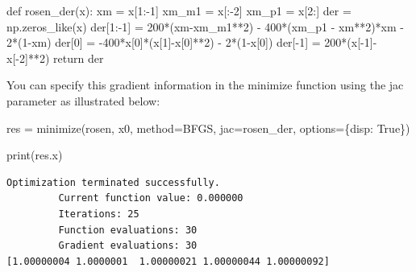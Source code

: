 \documentclass[
  letterpaper,
  DIV=11,
  numbers=noendperiod]{scrreprt}
\newenvironment{Shaded}{\begin{snugshade}}{\end{snugshade}}
\newcommand{\BuiltInTok}[1]{\textcolor[rgb]{0.00,0.23,0.31}{#1}}
\newcommand{\ControlFlowTok}[1]{\textcolor[rgb]{0.00,0.23,0.31}{#1}}
\newcommand{\DecValTok}[1]{\textcolor[rgb]{0.68,0.00,0.00}{#1}}
\newcommand{\KeywordTok}[1]{\textcolor[rgb]{0.00,0.23,0.31}{#1}}
\newcommand{\NormalTok}[1]{\textcolor[rgb]{0.00,0.23,0.31}{#1}}
\newcommand{\OperatorTok}[1]{\textcolor[rgb]{0.37,0.37,0.37}{#1}}
\newcommand{\StringTok}[1]{\textcolor[rgb]{0.13,0.47,0.30}{#1}}
\newcommand{\VariableTok}[1]{\textcolor[rgb]{0.07,0.07,0.07}{#1}}
\begin{document}
\begin{tcolorbox}
\begin{Shaded}
\begin{Highlighting}[]
\KeywordTok{def}\NormalTok{ rosen\_der(x):}
\NormalTok{    xm }\OperatorTok{=}\NormalTok{ x[}\DecValTok{1}\NormalTok{:}\OperatorTok{{-}}\DecValTok{1}\NormalTok{]}
\NormalTok{    xm\_m1 }\OperatorTok{=}\NormalTok{ x[:}\OperatorTok{{-}}\DecValTok{2}\NormalTok{]}
\NormalTok{    xm\_p1 }\OperatorTok{=}\NormalTok{ x[}\DecValTok{2}\NormalTok{:]}
\NormalTok{    der }\OperatorTok{=}\NormalTok{ np.zeros\_like(x)}
\NormalTok{    der[}\DecValTok{1}\NormalTok{:}\OperatorTok{{-}}\DecValTok{1}\NormalTok{] }\OperatorTok{=} \DecValTok{200}\OperatorTok{*}\NormalTok{(xm}\OperatorTok{{-}}\NormalTok{xm\_m1}\OperatorTok{**}\DecValTok{2}\NormalTok{) }\OperatorTok{{-}} \DecValTok{400}\OperatorTok{*}\NormalTok{(xm\_p1 }\OperatorTok{{-}}\NormalTok{ xm}\OperatorTok{**}\DecValTok{2}\NormalTok{)}\OperatorTok{*}\NormalTok{xm }\OperatorTok{{-}} \DecValTok{2}\OperatorTok{*}\NormalTok{(}\DecValTok{1}\OperatorTok{{-}}\NormalTok{xm)}
\NormalTok{    der[}\DecValTok{0}\NormalTok{] }\OperatorTok{=} \OperatorTok{{-}}\DecValTok{400}\OperatorTok{*}\NormalTok{x[}\DecValTok{0}\NormalTok{]}\OperatorTok{*}\NormalTok{(x[}\DecValTok{1}\NormalTok{]}\OperatorTok{{-}}\NormalTok{x[}\DecValTok{0}\NormalTok{]}\OperatorTok{**}\DecValTok{2}\NormalTok{) }\OperatorTok{{-}} \DecValTok{2}\OperatorTok{*}\NormalTok{(}\DecValTok{1}\OperatorTok{{-}}\NormalTok{x[}\DecValTok{0}\NormalTok{])}
\NormalTok{    der[}\OperatorTok{{-}}\DecValTok{1}\NormalTok{] }\OperatorTok{=} \DecValTok{200}\OperatorTok{*}\NormalTok{(x[}\OperatorTok{{-}}\DecValTok{1}\NormalTok{]}\OperatorTok{{-}}\NormalTok{x[}\OperatorTok{{-}}\DecValTok{2}\NormalTok{]}\OperatorTok{**}\DecValTok{2}\NormalTok{)}
    \ControlFlowTok{return}\NormalTok{ der}
\end{Highlighting}
\end{Shaded}

You can specify this gradient information in the minimize function using
the jac parameter as illustrated below:

\begin{Shaded}
\begin{Highlighting}[]
\NormalTok{res }\OperatorTok{=}\NormalTok{ minimize(rosen, x0, method}\OperatorTok{=}\StringTok{\textquotesingle{}BFGS\textquotesingle{}}\NormalTok{, jac}\OperatorTok{=}\NormalTok{rosen\_der,}
\NormalTok{               options}\OperatorTok{=}\NormalTok{\{}\StringTok{\textquotesingle{}disp\textquotesingle{}}\NormalTok{: }\VariableTok{True}\NormalTok{\})}

\BuiltInTok{print}\NormalTok{(res.x)}
\end{Highlighting}
\end{Shaded}

\begin{verbatim}
Optimization terminated successfully.
         Current function value: 0.000000
         Iterations: 25
         Function evaluations: 30
         Gradient evaluations: 30
[1.00000004 1.0000001  1.00000021 1.00000044 1.00000092]
\end{verbatim}

\end{tcolorbox}
\end{document}
